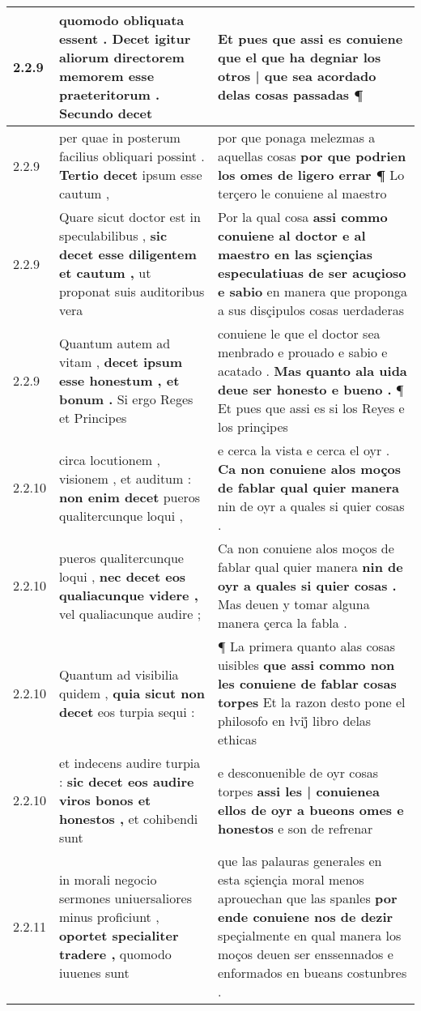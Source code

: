 \begin{tabular}{|p{1cm}|p{6.5cm}|p{6.5cm}|}
2.2.9 & quomodo obliquata essent . \textbf{ Decet igitur aliorum directorem memorem esse praeteritorum . } Secundo decet & Et pues que assi es conuiene \textbf{ que el que ha degniar los otros | que sea acordado delas cosas passadas } ¶ \\\hline
2.2.9 & per quae in posterum facilius obliquari possint . \textbf{ Tertio decet } ipsum esse cautum , & por que ponaga melezmas a aquellas cosas \textbf{ por que podrien los omes de ligero errar ¶ } Lo terçero le conuiene al maestro \\\hline
2.2.9 & Quare sicut doctor est in speculabilibus , \textbf{ sic decet esse diligentem et cautum , } ut proponat suis auditoribus vera & Por la qual cosa \textbf{ assi commo conuiene al doctor e al maestro en las sçiençias especulatiuas de ser acuçioso e sabio } en manera que proponga a sus disçipulos cosas uerdaderas \\\hline
2.2.9 & Quantum autem ad vitam , \textbf{ decet ipsum esse honestum , et bonum . } Si ergo Reges et Principes & conuiene le que el doctor sea menbrado e prouado e sabio e acatado . \textbf{ Mas quanto ala uida deue ser honesto e bueno . } ¶ Et pues que assi es si los Reyes e los prinçipes \\\hline
2.2.10 & circa locutionem , visionem , et auditum : \textbf{ non enim decet } pueros qualitercunque loqui , & e cerca la vista e cerca el oyr . \textbf{ Ca non conuiene alos moços de fablar qual quier manera } nin de oyr a quales si quier cosas . \\\hline
2.2.10 & pueros qualitercunque loqui , \textbf{ nec decet eos qualiacunque videre , } vel qualiacunque audire ; & Ca non conuiene alos moços de fablar qual quier manera \textbf{ nin de oyr a quales si quier cosas . } Mas deuen y tomar alguna manera çerca la fabla . \\\hline
2.2.10 & Quantum ad visibilia quidem , \textbf{ quia sicut non decet } eos turpia sequi : & ¶ La primera quanto alas cosas uisibles \textbf{ que assi commo non les conuiene de fablar cosas torpes } Et la razon desto pone el philosofo en łvij̊ libro delas ethicas \\\hline
2.2.10 & et indecens audire turpia : \textbf{ sic decet eos audire viros bonos et honestos , } et cohibendi sunt & e desconuenible de oyr cosas torpes \textbf{ assi les | conuienea ellos de oyr a bueons omes e honestos } e son de refrenar \\\hline
2.2.11 & in morali negocio sermones uniuersaliores minus proficiunt , \textbf{ oportet specialiter tradere , } quomodo iuuenes sunt & que las palauras generales en esta sçiençia moral menos aprouechan que las spanles \textbf{ por ende conuiene nos de dezir } speçialmente en qual manera los moços deuen ser enssennados e enformados en bueans costunbres . \\\hline

\end{tabular}
